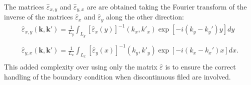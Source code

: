 \documentclass[a4paper,10pt]{report}
\begin{document}
The matrices $\hat{\varepsilon}_{x,y}$ and $\hat{\varepsilon}_{y,x}$ are are obtained taking the Fourier transform of the inverse of the matrices $\hat{\varepsilon}_{x}$ and $\hat{\varepsilon}_{y}$ along the other direction:
\begin{equation}
\begin{array}{c}
\hat{\varepsilon}_{x,y}(\mathbf{k},\mathbf{k}') = \frac{1}{L_y} \int_{L_y} [\hat{\varepsilon}_x(y)]^{-1}(k_x,k'_x) \exp[-i(k_y-k_y')y] dy \\
\quad \\
\hat{\varepsilon}_{y,x}(\mathbf{k},\mathbf{k}') = \frac{1}{L_x} \int_{L_x} [\hat{\varepsilon}_y(x)]^{-1}(k_y,k'_y) \exp[-i(k_x-k_x')x] dx. \\
\end{array}
\end{equation}
This added complexity over using only the matrix $\hat{\varepsilon}$ is to ensure the correct handling of the boundary condition when discontinuous filed are involved.
\end{document}
